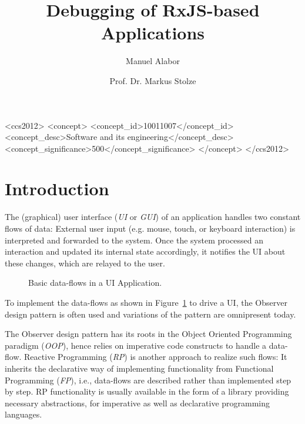 \documentclass[sigplan,screen,review]{acmart}
\title{Debugging of RxJS-based Applications}
\author{Manuel Alabor}
\affiliation{
	\institution{Eastern Switzerland University of Applied Sciences}
	\city{Rapperswil}
	\country{Switzerland}
}
\author{Prof. Dr. Markus Stolze}
\affiliation{
	\institution{Eastern Switzerland University of Applied Sciences}
	\city{Rapperswil}
	\country{Switzerland}
}
\begin{document}
\begin{abstract}
	
\end{abstract}

\begin{CCSXML}
	<ccs2012>
	   <concept>
		   <concept_id>10011007</concept_id>
		   <concept_desc>Software and its engineering</concept_desc>
		   <concept_significance>500</concept_significance>
		   </concept>
	 </ccs2012>
\end{CCSXML}



\maketitle

\section{Introduction}

The (graphical) user interface (\emph{UI} or \emph{GUI}) of an application handles two constant flows of data: External user input (e.g. mouse, touch, or keyboard interaction) is interpreted and forwarded to the system. Once the system processed an interaction and updated its internal state accordingly, it notifies the UI about these changes, which are relayed to the user.

\begin{figure}
	\centering
	\caption{Basic data-flows in a UI Application.}
	\label{fig:ui-data-flows}
\end{figure}

To implement the data-flows as shown in Figure~\ref{fig:ui-data-flows} to drive a UI, the Observer design pattern\cite{gamma1995design} is often used and variations of the pattern are omnipresent today\cite{alabor:2019:reactiveappllications}.

The Observer design pattern has its roots in the Object Oriented Programming paradigm (\emph{OOP}), hence relies on imperative code constructs to handle a data-flow. Reactive Programming (\emph{RP}) is another approach to realize such flows: It inherits the declarative way of implementing functionality from Functional Programming (\emph{FP}), i.e., data-flows are described rather than implemented step by step\cite{10.1145/2501654.2501666}. RP functionality is usually available in the form of a library providing necessary abstractions, for imperative as well as declarative programming languages.
\end{document}
